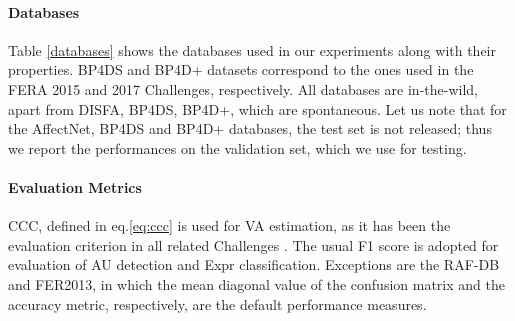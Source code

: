 \documentclass{bmvc2k}
\begin{document}
\paragraph{Databases} 
Table \ref{databases} shows the databases used in our experiments along with their properties. BP4DS and BP4D+ datasets correspond to the ones used in the FERA 2015 \cite{valstar2015fera} and 2017 \cite{valstar2017fera} Challenges, respectively. All databases are in-the-wild, apart from DISFA, BP4DS, BP4D+, which are spontaneous. Let us note that for the AffectNet, BP4DS and BP4D+ databases, the test set is not released; thus we report the performances on the validation set, which we use for testing.

\begin{table}[h]
\caption{Properties of Databases used in our Experiments} 
\label{databases}
\centering
{}
\end{table}

\paragraph{Evaluation Metrics}
CCC, defined in eq.\ref{eq:ccc} is used for VA estimation, as it has been the evaluation criterion in all related Challenges \cite{kollias2019deep,ringeval2017avec}. The usual F1 score is adopted for evaluation of AU detection and Expr classification. Exceptions are the RAF-DB and FER2013, in which the mean diagonal value of the confusion matrix and the accuracy metric, respectively, are the default performance measures.
\end{document}
